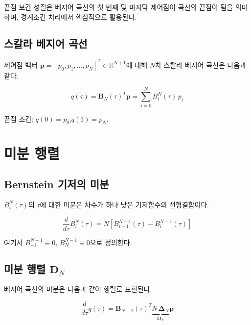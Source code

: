 \documentclass[11pt]{article}
\begin{document}
끝점 보간 성질은 베지어 곡선의 첫 번째 및 마지막 제어점이 곡선의 끝점이 됨을 의미하며,
경계조건 처리에서 핵심적으로 활용된다.

\subsection{스칼라 베지어 곡선}

제어점 벡터 $\mathbf{p} = [p_0, p_1, \ldots, p_N]^T \in \mathbb{R}^{N+1}$에 대해
$N$차 스칼라 베지어 곡선은 다음과 같다.

\begin{equation}
  q(\tau) = \mathbf{B}_N(\tau)^T \mathbf{p} = \sum_{i=0}^{N} B_i^N(\tau)\, p_i
  \label{eq:bezier_scalar}
\end{equation}

끝점 조건: $q(0) = p_0$,\quad $q(1) = p_N$.

\section{미분 행렬}

\subsection{Bernstein 기저의 미분}

$B_i^N(\tau)$의 $\tau$에 대한 미분은 차수가 하나 낮은 기저함수의 선형결합이다.

\begin{equation}
  \frac{d}{d\tau}B_i^N(\tau) = N\left[B_{i-1}^{N-1}(\tau) - B_i^{N-1}(\tau)\right]
  \label{eq:bernstein_deriv}
\end{equation}

여기서 $B_{-1}^{N-1} \equiv 0$, $B_N^{N-1} \equiv 0$으로 정의한다.

\subsection{미분 행렬 $\mathbf{D}_N$}

베지어 곡선의 미분은 다음과 같이 행렬로 표현된다.

\begin{equation}
  \frac{d}{d\tau} q(\tau) = \mathbf{B}_{N-1}(\tau)^T \underbrace{N\,\boldsymbol{\Delta}_N}_{\mathbf{D}_N} \mathbf{p}
  \label{eq:bezier_deriv}
\end{equation}
\end{document}
